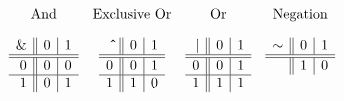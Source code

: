 $$
\begin{array}{cccc}
\mbox{And} & \mbox{Exclusive Or} & \mbox{Or} & \mbox{Negation}
\\[1em]
\begin{array}[t]{r||c|c}
      \mathbf{\&} & 0 & 1
\\\hline\hline   0  & 0 & 0
\\\hline         1  & 0 & 1
\end{array}
&
\begin{array}[t]{r||c|c}
      \mathbf{\hat{}} & 0 & 1
\\\hline\hline   0  & 0 & 1
\\\hline         1  & 1 & 0
\\ \end{array}
&
\begin{array}[t]{r||c|c}
      \mathbf{|} & 0 & 1
\\\hline\hline   0  & 0 & 1
\\\hline         1  & 1 & 1
\end{array}
&
\begin{array}[t]{r||c|c}
      \mathbf{\sim} & 0 & 1
\\\hline\hline      & 1 & 0
\end{array}
\end{array}
$$





